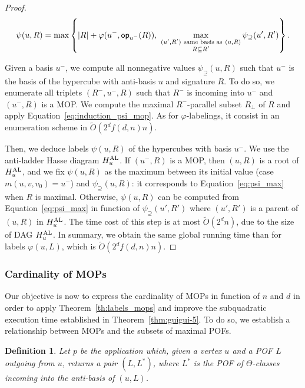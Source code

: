\documentclass{article}
\newtheorem{definition}{Definition}
\newcommand{\set}[1]{\left\{ #1 \right\}}
\newcommand{\card}[1]{\left| #1 \right|}
\newcommand{\opp}{\mbox{\textsf{op}}}
\newcommand{\hual}{H_u^{\mbox{\scriptsize{AL}}}}
\newcommand{\psis}{\psi_{\supseteq}}
\begin{document}
\begin{proof}
\begin{equation}
    \psi(u,R) = \max \set{\card{R} + \varphi(u^-,\opp_{u^-}(R)),~ \max\limits_{\substack{(u',R') ~\mbox{\scriptsize{same basis as}}~ (u,R) \\ R \subseteq R'}} \psis(u',R')}.
    \label{eq:psi_max}
\end{equation}

Given a basis $u^-$, we compute all nonnegative values $\psis(u,R)$ such that $u^-$ is the basis of the hypercube with anti-basis $u$ and signature $R$. To do so, we enumerate all triplets $(R^-,u^-,R)$ such that $R^-$ is incoming into $u^-$ and $(u^-,R)$ is a MOP. We compute the maximal $R^-$-parallel subset $R_{\perp}$ of $R$ and apply Equation~\eqref{eq:induction_psi_mop}. As for $\varphi$-labelings, it consist in an enumeration scheme in $\tilde{O}(2^df(d,n)n)$.

Then, we deduce labels $\psi(u,R)$ of the hypercubes with basis $u^-$. We use the anti-ladder Hasse diagram $\hual$. If $(u^-,R)$ is a MOP, then $(u,R)$ is a root of $\hual$, and we fix $\psi(u,R)$ as the maximum between its initial value (case $m(u,v,v_0) = u^-$) and $\psis(u,R)$: it corresponds to Equation~\eqref{eq:psi_max} when $R$ is maximal. Otherwise, $\psi(u,R)$ can be computed from Equation~\eqref{eq:psi_max} in function of $\psis(u',R')$ where $(u',R')$ is a parent of $(u,R)$ in $\hual$. The time cost of this step is at most $\tilde{O}(2^dn)$, due to the size of DAG $\hual$. In summary, we obtain the same global running time than for labels $\varphi(u,L)$, which is $\tilde{O}(2^df(d,n)n)$.
\end{proof}

\subsubsection{Cardinality of MOPs} \label{subsubsec:bound_mop}

Our objective is now to express the cardinality of MOPs in function of $n$ and $d$ in order to apply Theorem~\ref{th:labels_mops} and improve the subquadratic execution time established in Theorem~\ref{thm:guigui-5}. To do so, we establish a relationship between MOPs and the subsets of maximal POFs.

\begin{definition}
Let $p$ be the application which, given a vertex $u$ and a POF $L$ outgoing from $u$, returns a pair $(L,L^*)$, where $L^*$ is the POF of $\Theta$-classes incoming into the anti-basis of $(u,L)$.
\end{definition}
\end{document}
